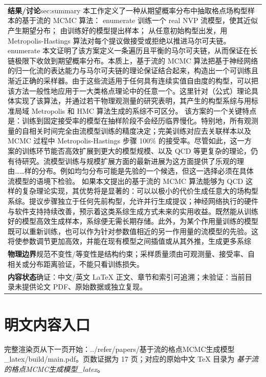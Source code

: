 \documentclass[UTF8,11pt,oneside]{ctexbook}
\begin{document}
\begin{table}[htbp]
\begin{tabular}{@{}p{}@{}}
    \textbf{结果/讨论}\quad sec:summary 本工作定义了一种从期望概率分布中抽取格点场构型样本的基于流的 MCMC 算法： enumerate 训练一个 real NVP 流模型，使其近似产生期望分布； 由训练好的模型提出样本； 从任意初始构型出发，用 Metropolis-Hastings 算法对每个提议做接受或拒绝以推进马尔可夫链。 enumerate 本文证明了该方案定义一条遍历且平衡的马尔可夫链，从而保证在长链极限下收敛到期望概率分布。本质上，基于流的 MCMC 算法把基于神经网络的归一化流的表达能力与马尔可夫链的理论保证结合起来，构造出一个可训练且渐近正确的采样器。由于这些流适用于任何具有连续实值自由度的构型，可以把该方法一般性地应用于一大类格点理论中的任意一个。这里针对（公式）理论具体实现了该算法，并通过若干物理观测量的研究表明，其产生的构型系综与用标准局域 Metropolis 和 HMC 算法生成的系综不可区分。 该方案的一个关键特点是：训练到固定接受率的模型在抽样阶段不会经历临界慢化。特别地，所有观测量的自相关时间完全由流模型训练的精度决定；完美训练对应去关联样本以及 MCMC 过程中 Metropolis-Hastings 步骤 100\% 的接受率。尽管如此，这一方案的训练环节能否高效扩展到更大的模型规模、以及 QCD 等更复杂的理论，仍有待研究。流模型训练与规模扩展方面的最新进展为这方面提供了乐观的理由……样的分布。例如均匀分布可能是先验的一个候选，但这一选择必须在具体流模型的语境下检验。 如果本文提出的基于流的 MCMC 算法能够为 QCD 这样的复杂理论实现，其优势将是显著的：可以以极小的代价生成任意大的场构型系综。提议步骤独立于任何先前构型，允许并行生成提议；神经网络执行的硬件与软件支持持续改善，预示着这类系综生成方式未来的实用收益。既然能从训练好的模型高效生成样本，系综便无需长期存储。此外，为某个作用量训练的模型既可以重新训练，也可以作为针对参数值相近的另一作用量的流模型的先验。这将使参数调节更加高效，并能在现有模型之间插值或从其外推，生成更多系综 \\
    \textbf{物理边界}\quad 规范不变性/等变性是结构约束；采样质量须由可观测量、接受率、自相关或分布距离验证，不能只看训练损失。 \\
    \textbf{内容状态}\quad 确证：中文/英文 LaTeX 正文、章节和索引可追溯；未验证：当前目录未提供论文 PDF、原始数据或独立复现。 \\
    \bottomrule
  \end{tabular}
\end{table}
\section*{明文内容入口}
\noindent 完整渲染页从下一页开始：../\allowbreak{}refer/\allowbreak{}papers/\allowbreak{}基于流的格点MCMC生成模型\_\allowbreak{}latex/\allowbreak{}build/\allowbreak{}main.pdf。页数证据为 17 页；对应的原始中文 TeX 目录为 \emph{基于流的格点MCMC生成模型\_latex}。
\clearpage

\clearpage
\end{document}
